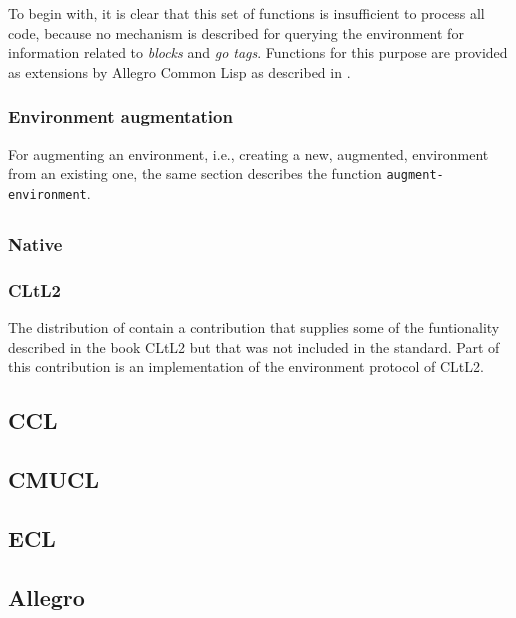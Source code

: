 To begin with, it is clear that this set of functions is insufficient
to process all \commonlisp{} code, because no mechanism is described
for querying the environment for information related to \emph{blocks}
and \emph{go tags}.  Functions for this purpose are provided as
extensions by Allegro Common Lisp as described in
.

\subsubsection{Environment augmentation}

For augmenting an environment, i.e., creating a new, augmented,
environment from an existing one, the same section describes the
function \texttt{augment-environment}.

\subsection{\sbcl{}}

\subsubsection{Native}

\subsubsection{CLtL2}

The distribution of \sbcl{} contain a contribution that supplies some
of the funtionality described in the book CLtL2 but that was not
included in the \commonlisp{} standard.  Part of this contribution is
an implementation of the environment protocol of CLtL2.

\subsection{CCL}

\subsection{CMUCL}

\subsection{ECL}

\subsection{Allegro}
\label{sec-previous-allegro}

